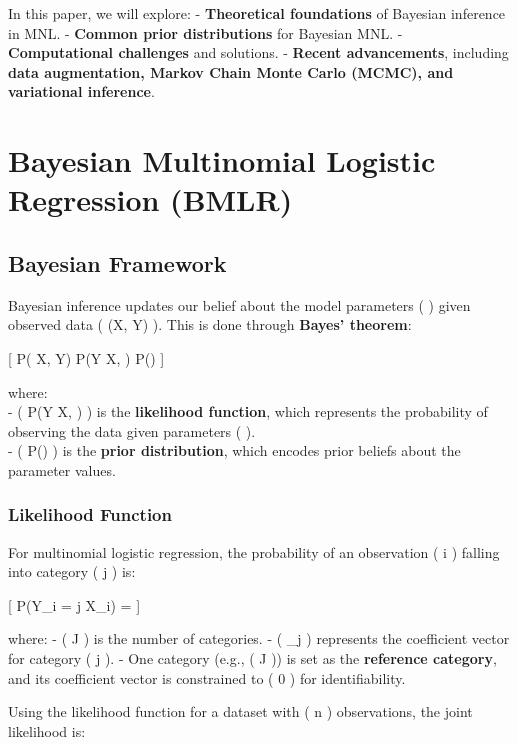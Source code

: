 \documentclass[
  letterpaper,
  DIV=11,
  numbers=noendperiod]{scrartcl}
\begin{document}
In this paper, we will explore: - \textbf{Theoretical foundations} of
Bayesian inference in MNL. - \textbf{Common prior distributions} for
Bayesian MNL. - \textbf{Computational challenges} and solutions. -
\textbf{Recent advancements}, including \textbf{data augmentation,
Markov Chain Monte Carlo (MCMC), and variational inference}.

\section{Bayesian Multinomial Logistic Regression
(BMLR)}\label{bayesian-multinomial-logistic-regression-bmlr}

\subsection{Bayesian Framework}\label{bayesian-framework}

Bayesian inference updates our belief about the model parameters (
\beta ) given observed data ( (X, Y) ). This is done through
\textbf{Bayes' theorem}:

{[} P(\beta \textbar{} X, Y) \propto P(Y \textbar{} X, \beta) P(\beta)
{]}

where:\\
- ( P(Y \textbar{} X, \beta) ) is the \textbf{likelihood function},
which represents the probability of observing the data given parameters
( \beta ).\\
- ( P(\beta) ) is the \textbf{prior distribution}, which encodes prior
beliefs about the parameter values.

\subsubsection{Likelihood Function}\label{likelihood-function}

For multinomial logistic regression, the probability of an observation (
i ) falling into category ( j ) is:

{[} P(Y\_i = j \textbar{} X\_i) =
 {]}

where: - ( J ) is the number of categories. - ( \beta\_j ) represents
the coefficient vector for category ( j ). - One category (e.g., ( J ))
is set as the \textbf{reference category}, and its coefficient vector is
constrained to ( 0 ) for identifiability.

Using the likelihood function for a dataset with ( n ) observations, the
joint likelihood is:
\end{document}
